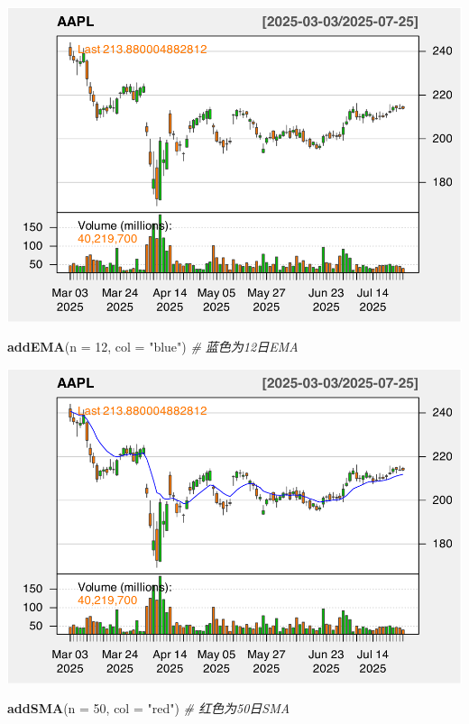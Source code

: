 \documentclass[]{ctexbook}
\newenvironment{Shaded}{\begin{snugshade}}{\end{snugshade}}
\newcommand{\AttributeTok}[1]{\textcolor[rgb]{0.13,0.29,0.53}{#1}}
\newcommand{\CommentTok}[1]{\textcolor[rgb]{0.56,0.35,0.01}{\textit{#1}}}
\newcommand{\DecValTok}[1]{\textcolor[rgb]{0.00,0.00,0.81}{#1}}
\newcommand{\FunctionTok}[1]{\textcolor[rgb]{0.13,0.29,0.53}{\textbf{#1}}}
\newcommand{\NormalTok}[1]{#1}
\newcommand{\StringTok}[1]{\textcolor[rgb]{0.31,0.60,0.02}{#1}}
\begin{document}
\includegraphics[width=0.9\linewidth]{QuantmodHandbook_files/figure-latex/ema_2-1}

\begin{Shaded}
\begin{Highlighting}[]
\FunctionTok{addEMA}\NormalTok{(}\AttributeTok{n =} \DecValTok{12}\NormalTok{, }\AttributeTok{col =} \StringTok{"blue"}\NormalTok{)    }\CommentTok{\# 蓝色为12日EMA}
\end{Highlighting}
\end{Shaded}

\includegraphics[width=0.9\linewidth]{QuantmodHandbook_files/figure-latex/ema_2-2}

\begin{Shaded}
\begin{Highlighting}[]
\FunctionTok{addSMA}\NormalTok{(}\AttributeTok{n =} \DecValTok{50}\NormalTok{, }\AttributeTok{col =} \StringTok{"red"}\NormalTok{)     }\CommentTok{\# 红色为50日SMA}
\end{Highlighting}
\end{Shaded}
\end{document}
